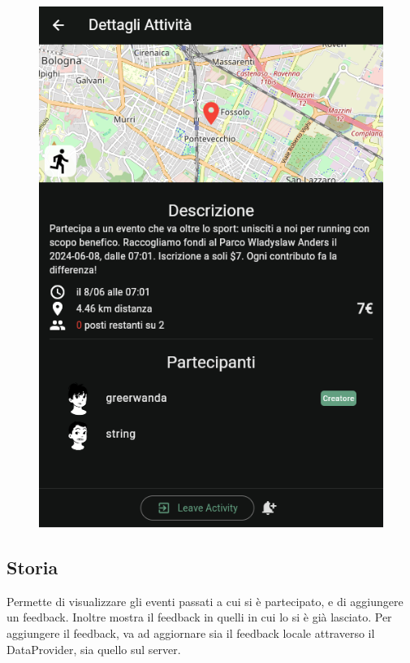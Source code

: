 \documentclass[a4paper,12pt]{article}
\begin{document}
\begin{figure}[H]
\begin{minipage}{0.32\textwidth}
        \includegraphics[width=1\linewidth]{img/joined.png}
    \end{minipage}
\end{figure}

\subsection{Storia}

Permette di visualizzare gli eventi passati a cui si è partecipato, e di aggiungere un feedback. Inoltre mostra il feedback in quelli in cui lo si è già lasciato.
Per aggiungere il feedback, va ad aggiornare sia il feedback locale attraverso il DataProvider, sia quello sul server.
\end{document}

